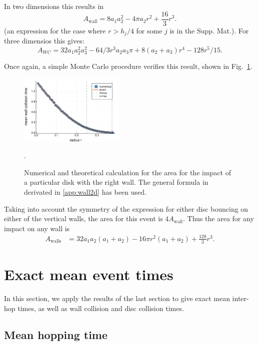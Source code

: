 \documentclass[superscriptaddress,pre,reprint,showpacs,twocolumn]{revtex4-1}
\begin{document}
In two dimensions this results in
\begin{equation}\label{areax1p}
 A_\mathrm{wall}  = 8 a_1 a_2 ^2-4  \pi a_2 r^2 +\frac{16}{3}r^3 .
\end{equation}
(an expression for the case where $r>h_j/4$ for some $j$ is in
the Supp. Mat.).
For three dimensios this gives:
\begin{equation}
  A_{WC}=32 a_1 a_2^2a_3^2 
  -64/3 r^3  a_2 a_3 \pi 
  +8(a_2+a_3)r^4
  -128 r^5/15.
\end{equation}

Once again, a simple Monte Carlo procedure verifies this result,
shown in Fig.~\ref{area1derecha}. 

\begin{figure}
\centering
\includegraphics[width=0.45\textwidth]{./figures/areawall01.pdf}
\caption{Numerical and theoretical calculation for the area
for the impact of a particular disk with the right wall.
The general formula in derivated in \ref{app:wall2d} has been used.}
\label{area1derecha}.
\end{figure}

Taking into account the symmetry of the expression for either disc
 bouncing on either of the vertical walls, the
area for this event is  $4A_\text{wall}$. 
Thus the area for any impact on any wall is
\begin{align}\label{areawalls}
 A_\text{walls} & = 32 a_1 a_2 (a_1+a_2)-16 \pi r^2 (a_1+a_2) +\frac{128}{3}r^3.
\end{align}


\section{Exact mean event times}

In this section, we apply the results of the last section to give
exact mean inter-hop times, as well as wall collision and disc collision times.


\subsection{Mean hopping time}
\end{document}
